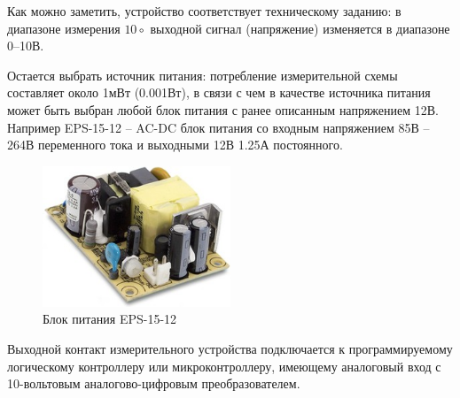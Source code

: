Как можно заметить, устройство соответствует техническому заданию: в диапазоне измерения $10\circ$ выходной сигнал (напряжение) изменяется в диапазоне 0--10В.

Остается выбрать источник питания: потребление измерительной схемы составляет около 1мВт (0.001Вт), в связи с чем в качестве источника питания может быть выбран любой блок питания с ранее описанным напряжением 12В.
Например EPS-15-12 -- AC-DC блок питания со входным напряжением 85В -- 264В переменного тока и выходными 12В 1.25А постоянного.
\begin{figure}[!h]
    \centering
    \includegraphics[width=0.5\textwidth]{img/img_8}
    \caption{Блок питания EPS-15-12}
    \label{fig:img_8}
\end{figure}

Выходной контакт измерительного устройства подключается к программируемому логическому контроллеру или микроконтроллеру, имеющему аналоговый вход с 10-вольтовым аналогово-цифровым преобразователем.
\newpage